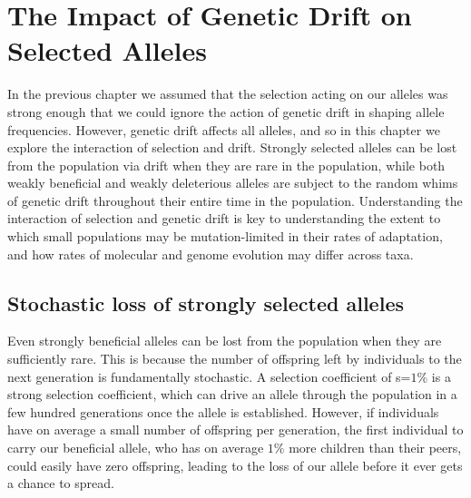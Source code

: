 \chapter{The Impact of Genetic Drift on Selected Alleles}
\label{Selection_Stochasticity}

In the previous chapter we assumed that the selection acting on our
alleles was strong enough that we could ignore the action of genetic
drift in shaping allele frequencies. However, genetic drift affects all
alleles, and so in this chapter we explore the interaction of
selection and drift. Strongly selected alleles can be
lost from the population via drift when they are rare in the population, while both weakly
beneficial and weakly deleterious alleles are subject to the random
whims of genetic drift throughout their entire time in the
population. Understanding the interaction of selection and genetic
drift is key to understanding the extent to which small populations
may be mutation-limited in their rates of adaptation, and how rates of
molecular and genome evolution may differ across taxa.

\section{Stochastic loss of strongly selected alleles}

Even strongly beneficial alleles can be lost from the population when
they are sufficiently rare. This is because the number of offspring
left by individuals to the next generation is fundamentally
stochastic. A selection coefficient of s=$1\%$ is a strong
selection coefficient, which can drive an allele through the
population in a few hundred generations once the allele is
established. However, if individuals have on average a small number of
offspring per generation, the first individual to carry our beneficial allele, who
has on average $1\%$ more children than their peers, could easily have zero offspring, leading to the loss
of our allele before it ever gets a chance to spread.\\

